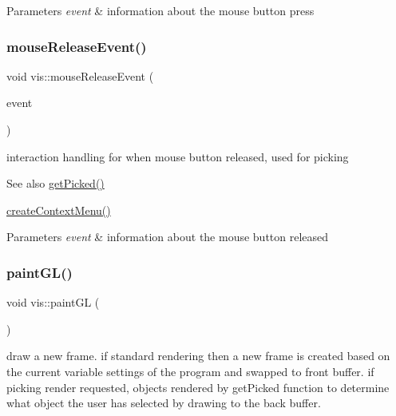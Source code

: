 \begin{DoxyParams}{Parameters}
{\em event} & information about the mouse button press \\
\hline
\end{DoxyParams}
\mbox{\label{classvis_a0c2adf27376ef0d784febfc572cd8729}} 
\subsubsection{\texorpdfstring{mouse\+Release\+Event()}{mouseReleaseEvent()}}
{\footnotesize\ttfamily void vis\+::mouse\+Release\+Event (\begin{DoxyParamCaption}\item[{Q\+Mouse\+Event $\ast$}]{event }\end{DoxyParamCaption})\hspace{0.3cm}{\ttfamily [protected]}}

interaction handling for when mouse button released, used for picking

\begin{DoxySeeAlso}{See also}
\mbox{\hyperlink{classvis_a9d1f882814f73ee4e49dbeb7102b008c}{get\+Picked()}} 

\mbox{\hyperlink{classvis_a63af66f730f0f06f36d255bcc7a7a244}{create\+Context\+Menu()}} 
\end{DoxySeeAlso}

\begin{DoxyParams}{Parameters}
{\em event} & information about the mouse button released \\
\hline
\end{DoxyParams}
\mbox{\label{classvis_ace835462bb98cad495e829c08e1a26ea}} 
\subsubsection{\texorpdfstring{paint\+G\+L()}{paintGL()}}
{\footnotesize\ttfamily void vis\+::paint\+GL (\begin{DoxyParamCaption}{ }\end{DoxyParamCaption})\hspace{0.3cm}{\ttfamily [protected]}}

draw a new frame. if standard rendering then a new frame is created based on the current variable settings of the program and swapped to front buffer. if picking render requested, objects rendered by get\+Picked function to determine what object the user has selected by drawing to the back buffer. \mbox{\label{classvis_af09e2926e8e8dfa0eca3d6b2f3946fdd}} 
